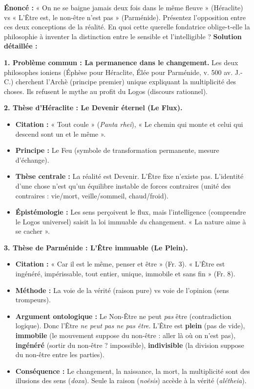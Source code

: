 \documentclass[11pt]{article}
\newcommand{\cle}[1]{{\popxbold\color{popdark}#1}}
\begin{document}
\begin{exoresolu}
\textbf{Énoncé :} « On ne se baigne jamais deux fois dans le même fleuve » (Héraclite) vs « L'Être est, le non-être n'est pas » (Parménide). Présentez l'opposition entre ces deux conceptions de la réalité. En quoi cette querelle fondatrice oblige-t-elle la philosophie à inventer la distinction entre le sensible et l'intelligible ?
\tcblower
\textbf{Solution détaillée :}

\textbf{1. Problème commun : La permanence dans le changement.}
Les deux philosophes ioniens (Éphèse pour Héraclite, Élée pour Parménide, v. 500 av. J.-C.) cherchent l'\cle{Archè} (principe premier) unique expliquant la multiplicité des choses. Ils refusent le mythe au profit du \cle{Logos} (discours rationnel).

\textbf{2. Thèse d'Héraclite : Le Devenir éternel (Le Flux).}
\begin{itemize}
    \item \textbf{Citation :} « Tout coule » (\emph{Panta rhei}), « Le chemin qui monte et celui qui descend sont un et le même ».
    \item \textbf{Principe :} Le \cle{Feu} (symbole de transformation permanente, mesure d'échange).
    \item \textbf{Thèse centrale :} La réalité est \cle{Devenir}. L'Être fixe n'existe pas. L'identité d'une chose n'est qu'un équilibre instable de forces contraires (\cle{unité des contraires} : vie/mort, veille/sommeil, chaud/froid).
    \item \textbf{Épistémologie :} Les sens perçoivent le flux, mais l'intelligence (comprendre le \cle{Logos} universel) saisit la loi immuable \emph{du} changement. « La nature aime à se cacher ».
\end{itemize}

\textbf{3. Thèse de Parménide : L'Être immuable (Le Plein).}
\begin{itemize}
    \item \textbf{Citation :} « Car il est le même, penser et être » (Fr. 3). « L'Être est ingénéré, impérissable, tout entier, unique, immobile et sans fin » (Fr. 8).
    \item \textbf{Méthode :} La \cle{voie de la vérité} (raison pure) vs \cle{voie de l'opinion} (sens trompeurs).
    \item \textbf{Argument ontologique :} Le Non-Être ne peut \emph{pas} être (contradiction logique). Donc l'Être \emph{ne peut pas ne pas être}. L'Être est \textbf{plein} (pas de vide), \textbf{immobile} (le mouvement suppose du non-être : aller là où on n'est pas), \textbf{ingénéré} (sortir du non-être ? impossible), \textbf{indivisible} (la division suppose du non-être entre les parties).
    \item \textbf{Conséquence :} Le changement, la naissance, la mort, la multiplicité sont des \cle{illusions des sens} (\emph{doxa}). Seule la raison (\emph{noêsis}) accède à la vérité (\emph{alétheia}).
\end{itemize}


\end{exoresolu}
\end{document}
